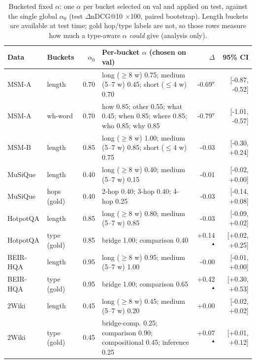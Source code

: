 \begin{table}[t]
\centering\small\setlength{\tabcolsep}{4pt}
\begin{tabular}{llrp{7.2cm}rr}
\toprule
Data & Buckets & $\alpha_0$ & Per-bucket $\alpha$ (chosen on val) & $\Delta$ & 95\% CI \\
\midrule
MSM-A & length & 0.70 & {\scriptsize long ($\ge$8 w) 0.75; medium (5--7 w) 0.45; short ($\le$4 w) 0.70} & -0.69$^{\triangledown}$ & [-0.87, -0.52] \\
MSM-A & wh-word & 0.70 & {\scriptsize how 0.85; other 0.55; what 0.45; when 0.85; where 0.85; who 0.85; why 0.85} & -0.79$^{\triangledown}$ & [-1.01, -0.57] \\
MSM-B & length & 0.85 & {\scriptsize long ($\ge$8 w) 1.00; medium (5--7 w) 0.85; short ($\le$4 w) 0.75} & -0.03 & [-0.30, +0.24] \\
MuSiQue & length & 0.40 & {\scriptsize long ($\ge$8 w) 0.40; medium (5--7 w) 0.15} & -0.01 & [-0.02, +0.00] \\
MuSiQue & hops (gold) & 0.40 & {\scriptsize 2-hop 0.40; 3-hop 0.40; 4-hop 0.25} & -0.03 & [-0.14, +0.08] \\
HotpotQA & length & 0.85 & {\scriptsize long ($\ge$8 w) 0.80; medium (5--7 w) 0.85} & -0.03 & [-0.09, +0.02] \\
HotpotQA & type (gold) & 0.85 & {\scriptsize bridge 1.00; comparison 0.40} & +0.14$^{\blacktriangle}$ & [+0.02, +0.25] \\
BEIR-HQA & length & 0.95 & {\scriptsize long ($\ge$8 w) 0.95; medium (5--7 w) 1.00} & -0.00 & [-0.01, +0.00] \\
BEIR-HQA & type (gold) & 0.95 & {\scriptsize bridge 1.00; comparison 0.65} & +0.42$^{\blacktriangle}$ & [+0.30, +0.53] \\
2Wiki & length & 0.45 & {\scriptsize long ($\ge$8 w) 0.45; medium (5--7 w) 0.20} & +0.00 & [-0.02, +0.02] \\
2Wiki & type (gold) & 0.45 & {\scriptsize bridge-comp. 0.25; comparison 0.90; compositional 0.45; inference 0.25} & +0.07$^{\blacktriangle}$ & [+0.01, +0.12] \\
\bottomrule
\end{tabular}
\caption{Bucketed fixed $\alpha$: one $\alpha$ per bucket selected on val and applied on test, against the single global $\alpha_0$ (test $\Delta$nDCG@10 $\times$100, paired bootstrap). Length buckets are available at test time; gold hop/type labels are not, so those rows measure how much a type-aware $\alpha$ \emph{could} give (analysis only).}
\label{tab:bucketed}
\end{table}

